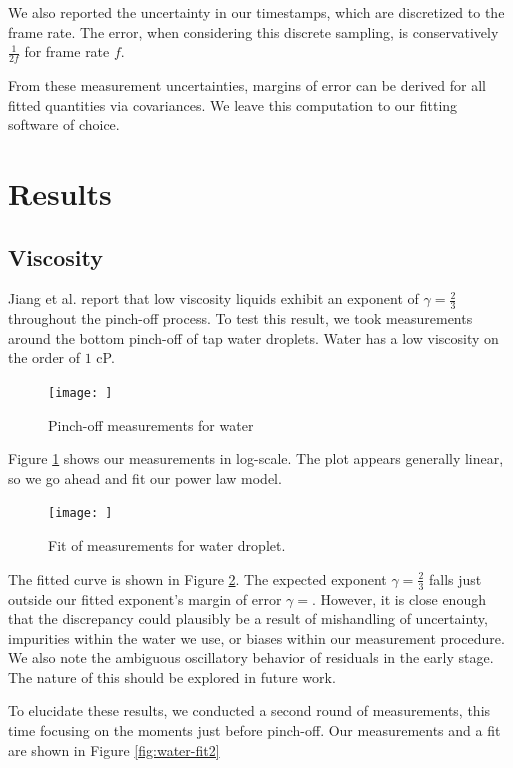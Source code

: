 \documentclass[12pt, letterpaper]{article}
\begin{document}
We also reported the uncertainty in our timestamps, which are discretized to the frame rate. The error, when considering this discrete sampling, is conservatively $\frac{1}{2f}$ for frame rate $f$. 

From these measurement uncertainties, margins of error can be derived for all fitted quantities via covariances. We leave this computation to our fitting software of choice. 

\section{Results}

\subsection{Viscosity}

Jiang et al. \cite{jiang} report that low viscosity liquids exhibit an exponent of $\gamma = \frac{2}{3}$ throughout the pinch-off process. To test this result, we took measurements around the bottom pinch-off of tap water droplets. Water has a low viscosity on the order of $1$ cP. 

\begin{figure}[!h]
    \centering
    \texttt{[image: ]}
    \caption{Pinch-off measurements for water}
    \label{fig:water1}
\end{figure}

Figure \ref{fig:water1} shows our measurements in log-scale. The plot appears generally linear, so we go ahead and fit our power law model. 

\begin{figure}[!h]
    \centering
    \texttt{[image: ]}
    \caption{Fit of measurements for water droplet.}
    \label{fig:water-fit1}
\end{figure}

The fitted curve is shown in Figure \ref{fig:water-fit1}. The expected exponent $\gamma = \frac{2}{3}$ falls just outside our fitted exponent's margin of error $\gamma = $. However, it is close enough that the discrepancy could plausibly be a result of mishandling of uncertainty, impurities within the water we use, or biases within our measurement procedure. We also note the ambiguous oscillatory behavior of residuals in the early stage. The nature of this should be explored in future work. 

To elucidate these results, we conducted a second round of measurements, this time focusing on the moments just before pinch-off. Our measurements and a fit are shown in Figure \ref{fig:water-fit2}
\end{document}
